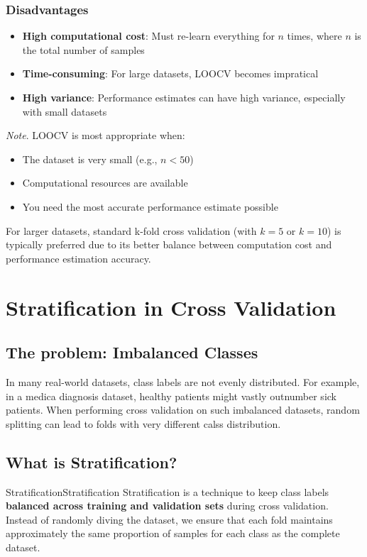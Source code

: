 \documentclass[a4paper]{article}
\theoremstyle{definition}
\begin{document}
\subsubsection{Disadvantages}
\begin{itemize}
    \item \textbf{High computational cost}: Must re-learn everything for \( n \) times, where \( n \) is the total number of samples 
    \item \textbf{Time-consuming}: For large datasets, LOOCV becomes impratical 
    \item \textbf{High variance}: Performance estimates can have high variance, especially with small datasets
\end{itemize}
\textit{Note}. LOOCV is most appropriate when:
\begin{itemize}
    \item The dataset is very small (e.g., \( n < 50 \)) 
    \item Computational resources are available 
    \item You need the most accurate performance estimate possible
\end{itemize}
For larger datasets, standard k-fold cross validation (with \( k = 5 \) or \( k = 10 \)) is typically preferred 
due to its better balance between computation cost and performance estimation accuracy.
\section{Stratification in Cross Validation}
\subsection{The problem: Imbalanced Classes}
In many real-world datasets, class labels are not evenly distributed. For example, in a medica 
diagnosis dataset, healthy patients might vastly outnumber sick patients. When performing cross validation on such 
imbalanced datasets, random splitting can lead to folds with very different calss 
distribution.
\subsection{What is Stratification?}
\begin{definition}{Stratification}{Stratification}
Stratification is a technique to keep class labels \textbf{balanced across training and validation sets} during 
cross validation. Instead of randomly diving the dataset, we ensure that each fold maintains approximately the same proportion 
of samples for each class as the complete dataset. 
\end{definition}
\end{document}
